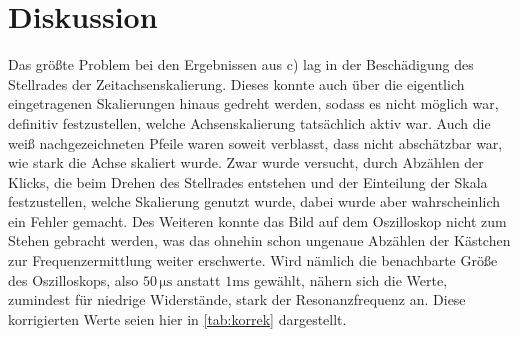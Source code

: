 \section{Diskussion}
\label{sec:Diskussion}



Das größte Problem bei den Ergebnissen aus c) lag in der Beschädigung des Stellrades der Zeitachsenskalierung. Dieses konnte auch über die eigentlich eingetragenen Skalierungen hinaus gedreht werden, sodass es nicht
möglich war, definitiv festzustellen, welche Achsenskalierung tatsächlich aktiv war. Auch die weiß nachgezeichneten Pfeile waren soweit verblasst, dass nicht abschätzbar war, wie stark die Achse skaliert wurde. Zwar
wurde versucht, durch Abzählen der Klicks, die beim Drehen des Stellrades entstehen und der Einteilung der Skala festzustellen, welche Skalierung genutzt wurde, dabei wurde aber wahrscheinlich ein Fehler gemacht.
Des Weiteren konnte das Bild auf dem Oszilloskop nicht zum Stehen gebracht werden, was das ohnehin schon ungenaue Abzählen der Kästchen zur Frequenzermittlung weiter erschwerte.
Wird nämlich die benachbarte Größe des Oszilloskops, also $50 \, \unit{\micro\second}$ anstatt $1 \unit{\milli\second}$ gewählt, nähern sich die Werte, zumindest für niedrige Widerstände, stark der Resonanzfrequenz an.
Diese korrigierten Werte seien hier in \autoref{tab:korrek} dargestellt.